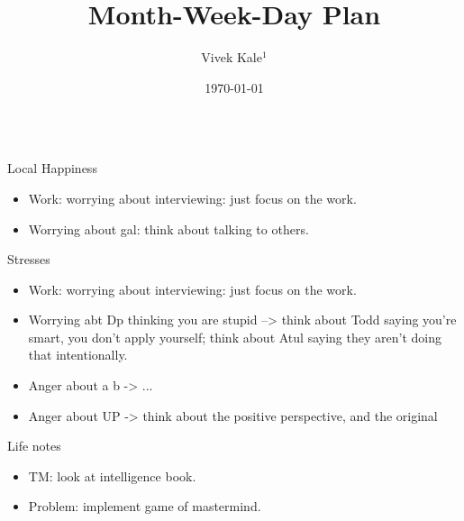 \documentclass[serif, mathserif, final]{beamer}
\title{Month-Week-Day Plan}\author{Vivek Kale$^1$}\institute{$^1$ University of Illinois at Urbana-Champaign}\date{\today}
\begin{document}
\begin{frame}
  \begin{columns}
    \begin{column}{0.25\linewidth} %
      \begin{block}{Local Happiness}
        \begin{itemize}
        \tiny \item \tiny Work: worrying about interviewing: just focus on the work. 
        \item \tiny Worrying about gal: think about talking to others. 
        \end{itemize}
      \end{block}
      \begin{block}{Stresses}
        \begin{itemize}
        \tiny \item \tiny Work: worrying about interviewing: just focus on the work. 
        \item \tiny Worrying abt Dp thinking you are stupid -->  think
            about Todd saying you're smart, you don't apply yourself; 
           think about Atul saying they aren't doing that
            intentionally. 
          \item \tiny Anger about a b  -> ...
          \item \tiny Anger about UP -> think about the positive
            perspective, and the original
        \end{itemize}
      \end{block}       
      \begin{block}{Life notes}
        \begin{itemize}
        \item \tiny TM: look at intelligence book. 
        \item \tiny Problem: implement game of mastermind. 
        \end{itemize}
      \end{block}
    \end{column} %


\end{columns}
\end{frame}
\end{document}
